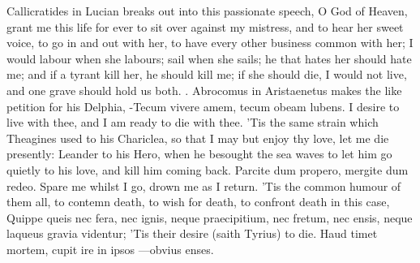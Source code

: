 {Callicratides in Lucian breaks out into this passionate speech, O
God of Heaven, grant me this life for ever to sit over against my
mistress, and to hear her sweet voice, to go in and out with her, to
have every other business common with her; I would labour when she
labours; sail when she sails; he that hates her should hate me; and if
a tyrant kill her, he should kill me; if she should die, I would not
live, and one grave should hold us both. . Abrocomus in Aristaenetus makes the like
petition for his Delphia, -Tecum vivere amem, tecum obeam lubens.
I desire to live with thee, and I am ready to die with thee. 'Tis the
same strain which Theagines used to his Chariclea, so that I may but
enjoy thy love, let me die presently: Leander to his Hero, when he
besought the sea waves to let him go quietly to his love, and kill him
coming back. Parcite dum propero, mergite dum redeo. Spare me
whilst I go, drown me as I return. 'Tis the common humour of them all,
to contemn death, to wish for death, to confront death in this case,
Quippe queis nec fera, nec ignis, neque praecipitium, nec fretum, nec
ensis, neque laqueus gravia videntur; 'Tis their desire (saith Tyrius)
to die.
Haud timet mortem, cupit ire in ipsos
---obvius enses.

}
